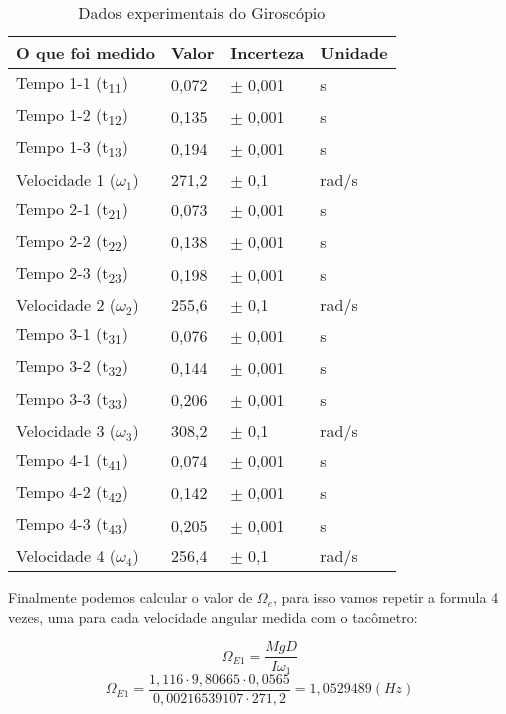 \begin{table}[H]
    \centering
    \begin{tabular}{ |M{5cm}||M{2cm}||M{2cm}||M{2cm}|  }
        \hline
        \textbf{O que foi medido} & \textbf{Valor} & \textbf{Incerteza} & \textbf{Unidade}\\
        \hline
        Tempo 1-1 (t\textsubscript{11})     & 0,072     & $\pm$ 0,001   & s\\
        Tempo 1-2 (t\textsubscript{12})     & 0,135     & $\pm$ 0,001   & s\\
        Tempo 1-3 (t\textsubscript{13})     & 0,194     & $\pm$ 0,001   & s\\
        Velocidade 1 ($\omega _1$)          & 271,2     & $\pm$ 0,1     & rad/s\\
        \hline
        Tempo 2-1 (t\textsubscript{21})     & 0,073     & $\pm$ 0,001   & s\\
        Tempo 2-2 (t\textsubscript{22})     & 0,138     & $\pm$ 0,001   & s\\
        Tempo 2-3 (t\textsubscript{23})     & 0,198     & $\pm$ 0,001   & s\\
        Velocidade 2 ($\omega _2$)          & 255,6     & $\pm$ 0,1     & rad/s\\
        \hline
        Tempo 3-1 (t\textsubscript{31})     & 0,076     & $\pm$ 0,001   & s\\
        Tempo 3-2 (t\textsubscript{32})     & 0,144     & $\pm$ 0,001   & s\\
        Tempo 3-3 (t\textsubscript{33})     & 0,206     & $\pm$ 0,001   & s\\
        Velocidade 3 ($\omega _3$)          & 308,2     & $\pm$ 0,1     & rad/s\\
        \hline
        Tempo 4-1 (t\textsubscript{41})     & 0,074     & $\pm$ 0,001   & s\\
        Tempo 4-2 (t\textsubscript{42})     & 0,142     & $\pm$ 0,001   & s\\
        Tempo 4-3 (t\textsubscript{43})     & 0,205     & $\pm$ 0,001   & s\\
        Velocidade 4 ($\omega _4$)          & 256,4     & $\pm$ 0,1     & rad/s\\
        \hline
    \end{tabular}
    \caption{Dados experimentais do Giroscópio}
\end{table}

Finalmente podemos calcular o valor de $\Omega _e$, para isso vamos repetir a formula 4 vezes, uma para cada velocidade angular medida com o tacômetro:

\[ \Omega _{E1} = \frac{MgD}{I \omega _1} \]
\[ \Omega _{E1} = \frac{1,116 \cdot 9,80665 \cdot 0,0565}{0,00216539107 \cdot 271,2} = 1,0529489 (Hz)\]




